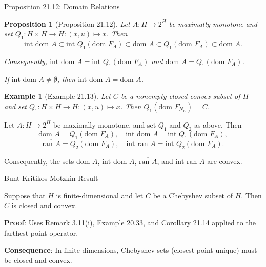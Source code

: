 \documentclass[aspectratio=169,10pt]{beamer}
\newtheorem{proposition}{Proposition}
\newtheorem{example}{Example}
\begin{document}
\begin{frame}[allowframebreaks]{Proposition 21.12: Domain Relations}
    \begin{proposition}[Proposition 21.12]
        Let $A: H \to 2^H$ be maximally monotone and set $Q_1: H \times H \to H: (x,u) \mapsto x$.
        Then
        \[
            \text{int dom } A \subset \text{int } Q_1(\text{dom } F_A) \subset \text{dom } A \subset Q_1(\text{dom } F_A) \subset \overline{\text{dom } A}.
        \]

        Consequently, $\text{int dom } A = \text{int } Q_1(\text{dom } F_A)$ and
        $\text{dom } A = Q_1(\text{dom } F_A)$.

        If $\text{int dom } A \neq \emptyset$, then $\text{int dom } A = \text{dom } A$.
    \end{proposition}

    \pagebreak

    \begin{example}[Example 21.13]
        Let $C$ be a nonempty closed convex subset of $H$ and set $Q_1: H \times H \to H: (x,u) \mapsto x$.
        Then $Q_1(\text{dom } F_{N_C}) = C$.
    \end{example}

    \begin{corollary}
        Let $A: H \to 2^H$ be maximally monotone, and set $Q_1$ and $Q_2$ as above. Then
        \[
            \text{dom } A = Q_1(\text{dom } F_A), \quad \text{int dom } A = \text{int } Q_1(\text{dom } F_A),
        \]
        \[
            \overline{\text{ran } A} = Q_2(\text{dom } F_A), \quad \text{int ran } A = \text{int } Q_2(\text{dom } F_A).
        \]

        Consequently, the sets $\text{dom } A$, $\text{int dom } A$, $\overline{\text{ran } A}$,
        and $\text{int ran } A$ are convex.
    \end{corollary}
\end{frame}

\begin{frame}{Bunt-Kritikos-Motzkin Result}
    \begin{corollary}
        Suppose that $H$ is finite-dimensional and let $C$ be a Chebyshev subset of $H$.
        Then $C$ is closed and convex.
    \end{corollary}

    \textbf{Proof}: Uses Remark 3.11(i), Example 20.33, and Corollary 21.14 applied to
    the farthest-point operator.

    \vspace{1em}
    \textbf{Consequence}: In finite dimensions, Chebyshev sets (closest-point unique)
    must be closed and convex.
\end{frame}
\end{document}
